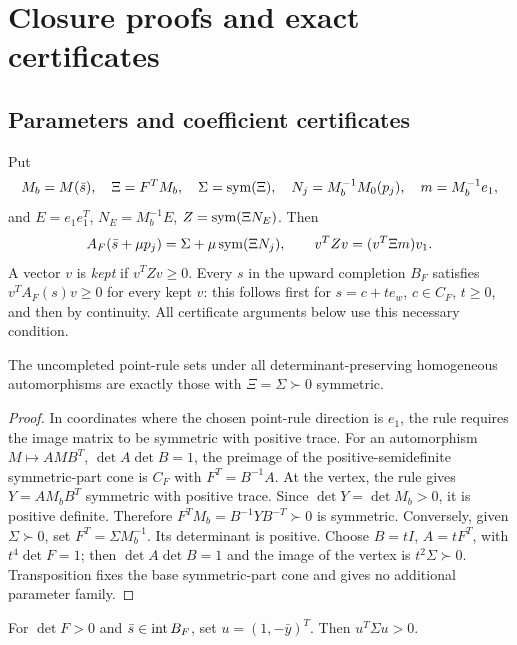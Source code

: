 \section{Closure proofs and exact certificates}\label{cl:appendix}

\subsection{Parameters and coefficient certificates}\label{cl:certificate-tools}

Put
\[
 M_b=M(\bar s),\quad \Xi=F^TM_b,\quad \Sigma=\operatorname{sym}(\Xi),\quad
 N_j=M_b^{-1}M_0(p_j),\quad m=M_b^{-1}e_1,
\]
and $E=e_1e_1^T$, $N_E=M_b^{-1}E$, $Z=\operatorname{sym}(\Xi N_E)$.
Then
\[
 A_F(\bar s+\mu p_j)=\Sigma+\mu\operatorname{sym}(\Xi N_j),\qquad
 v^TZv=(v^T\Xi m)v_1.
\]
A vector $v$ is \emph{kept} if $v^TZv\ge0$. Every $s$ in the upward
completion $B_F$ satisfies $v^TA_F(s)v\ge0$ for every kept $v$:
this follows first for $s=c+te_w$, $c\in C_F$, $t\ge0$, and then by
continuity. All certificate arguments below use this necessary condition.

\begin{lemma}\label{cl:point-parameters}
The uncompleted point-rule sets under all determinant-preserving
homogeneous automorphisms are exactly those with $\Xi=\Sigma\succ0$
symmetric.
\end{lemma}

\begin{proof}
In coordinates where the chosen point-rule direction is $e_1$, the rule
requires the image matrix to be symmetric with positive trace.
For an automorphism $M\mapsto AMB^T$, $\det A\det B=1$, the preimage of
the positive-semidefinite symmetric-part cone is $C_F$ with
$F^T=B^{-1}A$. At the vertex, the rule gives
$Y=AM_bB^T$ symmetric with positive trace. Since
$\det Y=\det M_b>0$, it is positive definite. Therefore
$F^TM_b=B^{-1}YB^{-T}\succ0$ is symmetric.
Conversely, given $\Sigma\succ0$, set $F^T=\Sigma M_b^{-1}$.
Its determinant is positive. Choose $B=tI$, $A=tF^T$, with
$t^4\det F=1$; then $\det A\det B=1$ and the image of the vertex is
$t^2\Sigma\succ0$. Transposition fixes the base symmetric-part cone
and gives no additional parameter family.
\end{proof}

\begin{lemma}\label{cl:halfspace}
For $\det F>0$ and $\bar s\in\operatorname{int} B_F$, set $u=(1,-\bar y)^T$.
Then $u^T\Sigma u>0$.
\end{lemma}

